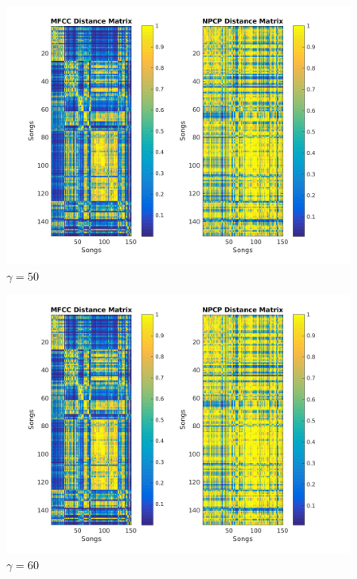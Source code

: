 \documentclass[11pt, a4paper]{article}
\begin{document}
\begin{figure}[H]
\hspace*{-2cm}    
    \centering
    \includegraphics[width=1.25\textwidth]{gamma50.png}
    \caption{$\gamma = 50$}
\end{figure}

\begin{figure}[H]
\hspace*{-2cm}    
    \centering
    \includegraphics[width=1.25\textwidth]{gamma60.png}
    \caption{$\gamma = 60$}
\end{figure}
\end{document}
